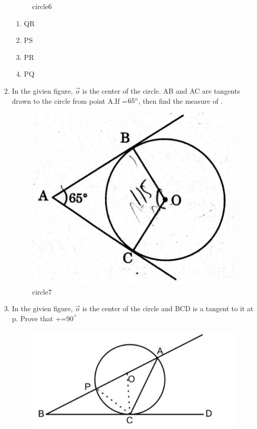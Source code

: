 \documentclass[10pt,a4paper]{article}
\begin{document}
\begin{enumerate}
\begin{figure}[!h]
			\caption{circle6}
			\label{fig=pic}
		\end{figure}
		\begin{enumerate}
			\item QR
			\item PS
			\item PR
			\item PQ
		\end{enumerate}
	\item In the givien figure, $\vec{o}$ is the center of the circle. AB and AC are tangents drawn to the
		circle from point A.If =$65{\degree}$, then find the measure of .
		\begin{figure}[!h]
			\centering
			\includegraphics[scale=0.19]{fig7.jpg}
			\caption{circle7}
			\label{fig=pic}
		\end{figure}
	\item In the givien figure, $\vec{o}$ is the center of the circle and BCD is a tangent to it at p. Prove 
		that +=90$^{\degree}$\\
		\begin{figure}[h!]
              \centering          
        	\includegraphics[scale=0.25]{fig8.jpg}     

\end{figure}
\end{enumerate}
\end{document}
